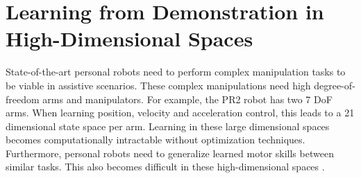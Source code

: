 \documentclass{sig-alternate-2013}
\begin{document}


\section{Learning from Demonstration in High-Dimensional Spaces}
\label{LfD in HD}

State-of-the-art personal robots need to perform complex manipulation tasks to be viable in assistive scenarios. These complex manipulations need high degree-of-freedom arms and manipulators. For example, the PR2 robot has two 7 DoF arms. When learning position, velocity and acceleration control, this leads to a 21 dimensional state space per arm. Learning in these large dimensional spaces becomes computationally intractable without optimization techniques. Furthermore, personal robots need to generalize learned motor skills between similar tasks. This also becomes difficult in these high-dimensional spaces \cite{Pastor_ICRA_2009}.

\end{document}
